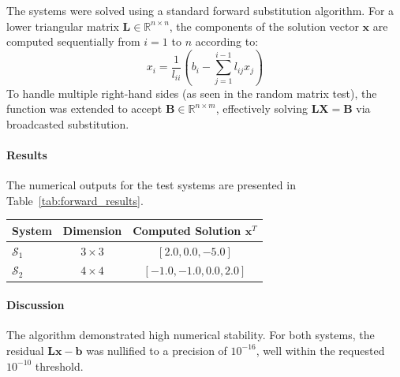 \begin{solution}

	The systems were solved using a standard forward substitution algorithm. For
	a lower triangular matrix $\mathbf{L} \in \mathbb{R}^{n \times n}$, the
	components of the solution vector $\mathbf{x}$ are computed sequentially from $i
		= 1$ to $n$ according to:
	\[
		x_i = \frac{1}{l_{ii}} \left( b_i - \sum_{j=1}^{i-1} l_{ij} x_j \right)
	\]
	To handle multiple right-hand sides (as seen in the random matrix test), the
	function was extended to accept $\mathbf{B} \in \mathbb{R}^{n \times m}$,
	effectively solving $\mathbf{L}\mathbf{X} = \mathbf{B}$ via broadcasted
	substitution.

	\paragraph{Results}
	The numerical outputs for the test systems are presented in
	Table~\ref{tab:forward_results}.
	\begin{center}
		\centering
		\label{tab:forward_results}
		\renewcommand{\arraystretch}{1.2}
		\begin{tabular}{lcc}
			\toprule
			System          & Dimension    & Computed Solution $\mathbf{x}^T$ \\
			\midrule
			$\mathcal{S}_1$ & $3 \times 3$ & $[2.0, 0.0, -5.0]$               \\
			$\mathcal{S}_2$ & $4 \times 4$ & $[-1.0, -1.0, 0.0, 2.0]$         \\
			\bottomrule
		\end{tabular}
	\end{center}

	\paragraph{Discussion}
	The algorithm demonstrated high numerical stability. For both systems, the
	residual $\mathbf{L}\mathbf{x} - \mathbf{b}$ was nullified to a precision of
	$10^{-16}$, well within the requested $10^{-10}$ threshold.

\end{solution}

